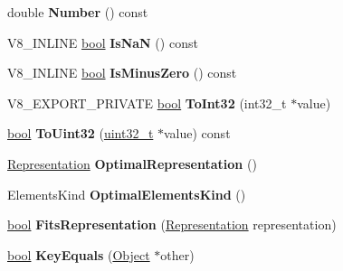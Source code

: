 \begin{DoxyCompactItemize}
\mbox{\label{classv8_1_1internal_1_1Object_a199ee3336e2f76ba948e371301f27396}} 
double {\bfseries Number} () const
\item 
\mbox{\label{classv8_1_1internal_1_1Object_adc61a2410c359c309b488524cd1f115a}} 
V8\+\_\+\+I\+N\+L\+I\+NE \mbox{\hyperlink{classbool}{bool}} {\bfseries Is\+NaN} () const
\item 
\mbox{\label{classv8_1_1internal_1_1Object_aa557fc625e9e14b351c01c392bcacdf5}} 
V8\+\_\+\+I\+N\+L\+I\+NE \mbox{\hyperlink{classbool}{bool}} {\bfseries Is\+Minus\+Zero} () const
\item 
\mbox{\label{classv8_1_1internal_1_1Object_a8fa72017bb0c2385165fe2075004b24b}} 
V8\+\_\+\+E\+X\+P\+O\+R\+T\+\_\+\+P\+R\+I\+V\+A\+TE \mbox{\hyperlink{classbool}{bool}} {\bfseries To\+Int32} (int32\+\_\+t $\ast$value)
\item 
\mbox{\label{classv8_1_1internal_1_1Object_a4baac51ee715c0716770ce5225650404}} 
\mbox{\hyperlink{classbool}{bool}} {\bfseries To\+Uint32} (\mbox{\hyperlink{classuint32__t}{uint32\+\_\+t}} $\ast$value) const
\item 
\mbox{\label{classv8_1_1internal_1_1Object_a9ceecdf37b8956d4be4eb45db0f3518d}} 
\mbox{\hyperlink{classv8_1_1internal_1_1Representation}{Representation}} {\bfseries Optimal\+Representation} ()
\item 
\mbox{\label{classv8_1_1internal_1_1Object_a82c1d8f9c05aa2cfa830f41309583a67}} 
Elements\+Kind {\bfseries Optimal\+Elements\+Kind} ()
\item 
\mbox{\label{classv8_1_1internal_1_1Object_a73384d8403dda7733708dbfc178f2c66}} 
\mbox{\hyperlink{classbool}{bool}} {\bfseries Fits\+Representation} (\mbox{\hyperlink{classv8_1_1internal_1_1Representation}{Representation}} representation)
\item 
\mbox{\label{classv8_1_1internal_1_1Object_a2e33849485658cc285ea94f1c16521f0}} 
\mbox{\hyperlink{classbool}{bool}} {\bfseries Key\+Equals} (\mbox{\hyperlink{classv8_1_1internal_1_1Object}{Object}} $\ast$other)

\end{DoxyCompactItemize}
